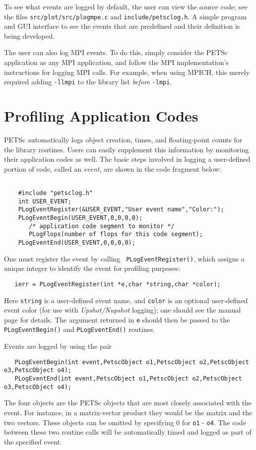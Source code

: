 {To see what events are logged by default, the user can view the source code; see
the files {\tt src/plot/src/plogmpe.c} and {\tt include/petsclog.h}.  A simple program and
GUI interface to see the events that are predefined and their definition is 
being developed.

The user can also log MPI events.  To do this, simply consider the
PETSc application as any MPI application, and follow the MPI
implementation's instructions for logging MPI calls. For example, when
using MPICH, this merely required adding {\tt -llmpi} to the library
list {\em before} {\tt -lmpi}.

\section{Profiling Application Codes}
\label{sec:profileuser}

PETSc automatically logs object creation, times, and floating-point
counts for the library routines. Users can easily supplement
this information by monitoring their application codes as well.  
The basic steps involved in logging a
user-defined portion of code, called an {\em event}, are shown in the 
code fragment below:
\begin{verbatim}

    #include "petsclog.h"
    int USER_EVENT;
    PLogEventRegister(&USER_EVENT,"User event name","Color:");
    PLogEventBegin(USER_EVENT,0,0,0,0);
       /* application code segment to monitor */
       PLogFlops(number of flops for this code segment);
    PLogEventEnd(USER_EVENT,0,0,0,0);

\end{verbatim}

One must register the event by calling {\tt
PLogEventRegister()}, which assigns a unique integer to identify the
event for profiling purposes: 
\begin{verbatim}
   ierr = PLogEventRegister(int *e,char *string,char *color);
\end{verbatim}
Here {\tt string} is a user-defined event name, and {\tt color} is an
optional user-defined event color (for use with {\em Upshot/Nupshot} logging);
one should see the manual page for details.  The argument returned in {\tt e} should then
be passed to the {\tt PLogEventBegin()} and {\tt PLogEventEnd()}
routines.

Events are logged by using the pair 
\begin{verbatim}
   PLogEventBegin(int event,PetscObject o1,PetscObject o2,PetscObject o3,PetscObject o4);
   PLogEventEnd(int event,PetscObject o1,PetscObject o2,PetscObject o3,PetscObject o4);
\end{verbatim}
The 
four objects are the PETSc objects that are most closely associated 
with the event.  For instance, in a matrix-vector product they 
would be the matrix and the two vectors.  These objects can be omitted
by specifying 0 for {\tt o1} - {\tt o4}.  The code between these 
two routine calls will be automatically timed and logged as part of the
specified event.

}
